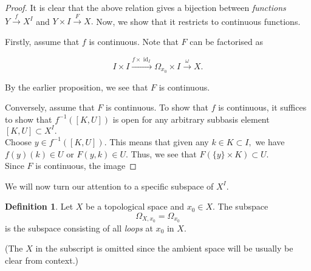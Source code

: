 \documentclass[12pt]{article}
\theoremstyle{definition}
\numberwithin{thm}{section}
\newtheorem{defn}[thm]{Definition}
\newcommand{\id}{\operatorname{id}}
\begin{document}
\begin{proof} 
	It is clear that the above relation gives a bijection between \emph{functions} $Y\overset{f}{\longrightarrow}X^I$ and $Y\times I\overset{F}{\longrightarrow}X.$ Now, we show that it restricts to continuous functions.

	Firstly, assume that $f$ is continuous. Note that $F$ can be factorised as

	\begin{equation*} 
		I \times I \overset{f \times \id_I}{\longrightarrow} \Omega_{x_0}\times I \overset{\omega}{\longrightarrow} X.
	\end{equation*}

	By the earlier proposition, we see that $F$ is continuous.

	Conversely, assume that $F$ is continuous. To show that $f$ is continuous, it suffices to show that $f^{-1}([K, U])$ is open for any arbitrary subbasis element $[K, U] \subset X^I.$\\
	Choose $y \in f^{-1}([K, U]).$ This means that given any $k \in K \subset I,$ we have $f(y)(k) \in U$ or $F(y, k) \in U.$ Thus, we see that $F(\{y\} \times K) \subset U.$\\
	Since $F$ is continuous, the image 
\end{proof}

We will now turn our attention to a specific subspace of $X^I.$

\begin{defn}
	Let $X$ be a topological space and $x_0 \in X.$ The subspace
	\begin{equation*} 
		\Omega_{X, x_0} = \Omega_{x_0}
	\end{equation*}
	is the subspace consisting of all \emph{loops} at $x_0$ in $X.$
\end{defn}

(The $X$ in the subscript is omitted since the ambient space will be usually be clear from context.)
\end{document}
